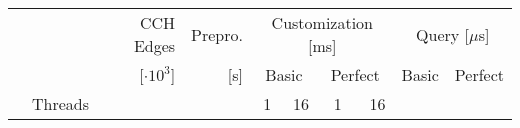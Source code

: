 \begin{tabular}{ll@{\hskip3pt}rrrrrrrr}
\toprule
 &         &     CCH Edges & Prepro. & \multicolumn{4}{c}{Customization [ms]} & \multicolumn{2}{c}{Query [$\mu$s]} \\ \cmidrule(l{4pt}r{4pt}){5-8} \cmidrule(l{4pt}r{4pt}){9-10}
 &         & [$\cdot 10^3$] &           [s] & \multicolumn{2}{c}{Basic} & \multicolumn{2}{c}{Perfect} & Basic & Perfect \\ \cmidrule(l{4pt}r{4pt}){5-6} \cmidrule(l{4pt}r{4pt}){7-8}
 & Threads &                &               & 1 & 16 & 1 & 16 \\
\midrule

\end{tabular}
